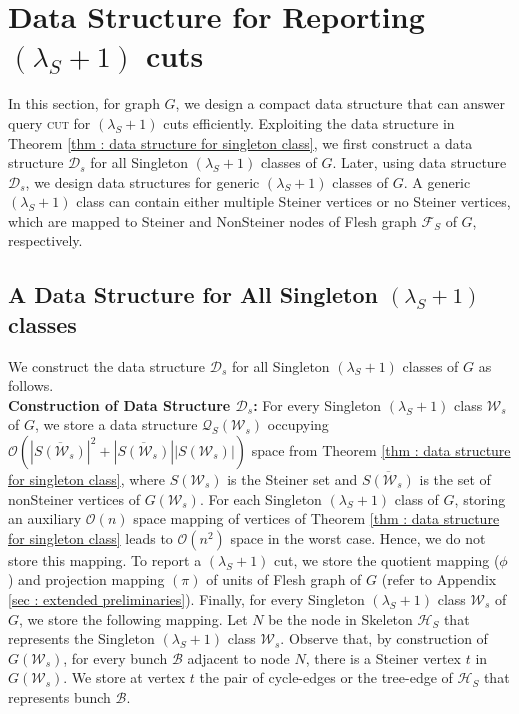 \documentclass[letterpaper,11pt]{article}
\begin{document}
\section{Data Structure for Reporting $(\lambda_S+1)$ cuts} \label{sec : data structure complete}
In this section, for graph $G$, we design a compact data structure that can answer query \textsc{cut} for $(\lambda_S+1)$ cuts efficiently.
Exploiting the data structure in Theorem \ref{thm : data structure for singleton class}, we first construct a data structure ${\mathcal D}_s$ for all Singleton $(\lambda_S+1)$ classes of $G$. Later, using data structure ${\mathcal D}_s$, we design data structures for generic $(\lambda_S+1)$ classes of $G$. A generic $(\lambda_S+1)$ class can contain either multiple Steiner vertices or no Steiner vertices, which are mapped to Steiner and NonSteiner nodes of Flesh graph ${\mathcal F}_S$ of $G$, respectively.
\subsection{A Data Structure for All Singleton $(\lambda_S+1)$ classes} \label{sec : data structure for all singleton classes}
We construct the data structure ${\mathcal D}_s$ for all Singleton $(\lambda_S+1)$ classes of $G$ as follows.\\

\noindent
\textbf{Construction of Data Structure ${\mathcal D}_s$:} For every Singleton $(\lambda_S+1)$ class ${\mathcal W}_s$ of $G$, we store a data structure ${\mathcal Q}_S({\mathcal W}_s)$ occupying ${\mathcal O}(|\overline{S({\mathcal W}_s)}|^2+|\overline{S({\mathcal W}_s)}||S({\mathcal W}_s)|)$ space from Theorem \ref{thm : data structure for singleton class}, where $S({\mathcal W}_s)$ is the Steiner set and $\overline{S({\mathcal W}_s)}$ is the set of nonSteiner vertices of $G({\mathcal W}_s)$. For each Singleton $(\lambda_S+1)$ class of $G$, storing an auxiliary ${\mathcal O}(n)$ space mapping of vertices of Theorem \ref{thm : data structure for singleton class} leads to ${\mathcal O}(n^2)$ space in the worst case. Hence, we do not store this mapping. To report a $(\lambda_S+1)$ cut, we store the quotient mapping ($\phi$) and projection mapping $(\pi)$ of units of Flesh graph of $G$ (refer to Appendix \ref{sec : extended preliminaries}). Finally, for every Singleton $(\lambda_S+1)$ class ${\mathcal W}_s$ of $G$, we store the following mapping. Let $N$ be the node in Skeleton ${\mathcal H}_S$ that represents the Singleton $(\lambda_S+1)$ class ${\mathcal W}_s$. Observe that, by construction of $G({\mathcal W}_s)$, for every bunch ${\mathcal B}$ adjacent to node $N$, there is a Steiner vertex $t$ in $G({\mathcal W}_s)$. We store at vertex $t$ the pair of cycle-edges or the tree-edge of ${\mathcal H}_S$ that represents bunch ${\mathcal B}$. \\ 
\end{document}
